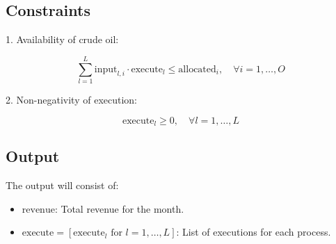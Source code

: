 \documentclass{article}
\begin{document}
\subsection*{Constraints}

1. Availability of crude oil:

\[
\sum_{l=1}^{L} \text{input}_{l,i} \cdot \text{execute}_l \leq \text{allocated}_i, \quad \forall i = 1, \ldots, O
\]

2. Non-negativity of execution:

\[
\text{execute}_l \geq 0, \quad \forall l = 1, \ldots, L
\]

\subsection*{Output}

The output will consist of:

\begin{itemize}
    \item \( \text{revenue} \): Total revenue for the month.
    \item \( \text{execute} = [\text{execute}_l \text{ for } l=1, \ldots, L] \): List of executions for each process.
\end{itemize}
\end{document}
